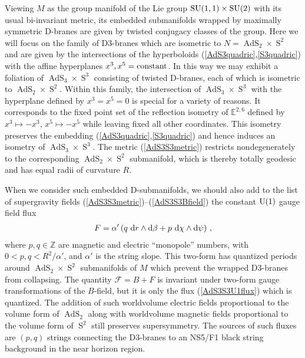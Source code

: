 \documentclass[11pt,a4paper]{article}
\DeclareMathOperator{\AdS}{AdS}
\DeclareMathOperator{\Sphere}{S}
\let\S\Sphere
\def\dd{{\rm d}}
\newcommand{\zed}{{\mathbb Z}} %
\newcommand{\eucl}{{\mathbb E}}
\newcommand{\beq}{\begin{eqnarray}}
\newcommand{\eeq}{\end{eqnarray}}
\begin{document}
Viewing $M$ as the group manifold of the Lie group ${\rm
  SU}(1,1)\times{\rm SU}(2)$ with its usual bi-invariant metric, its
  embedded submanifolds wrapped by maximally symmetric D-branes are given
  by twisted conjugacy classes of the group. Here we will focus on the
  family of D3-branes which are isometric to $N=\AdS_2\times\Sphere^2$
  and are given by the intersections of the hyperboloids
  (\ref{AdS3quadric},\ref{S3quadric}) with the affine hyperplanes
  $x^3,x^5={\rm constant}$. In this way we may
  exhibit a foliation of $\AdS_3\times\S^3$ consisting of twisted
  D-branes, each of which is isometric to
  $\AdS_2\times\S^2$. Within this family, the intersection of
  $\AdS_3\times\S^3$ with the hyperplane defined by $x^3=x^5=0$ is
  special for a variety of reasons. It
  corresponds to the fixed point set of the reflection isometry of
  $\eucl^{2,6}$ defined by $x^3\mapsto-x^3$, $x^5\mapsto-x^5$ while
  leaving fixed all other coordinates. This isometry preserves the
  embedding (\ref{AdS3quadric},\ref{S3quadric}) and hence induces an
  isometry of $\AdS_3\times\S^3$. The metric (\ref{AdS3S3metric})
  restricts nondegenerately to the corresponding $\AdS_2\times\S^2$
  submanifold, which is thereby totally geodesic and has equal radii of
  curvature $R$.

When we consider such embedded D-submanifolds, we should also add to
the list of supergravity fields
(\ref{AdS3S3metric})--(\ref{AdS3S3Bfield}) the
constant ${\rm U}(1)$ gauge field flux
\beq
F=\alpha'\,(q~\dd r\wedge\dd\beta+p~\dd\chi\wedge\dd\psi) \ ,
\label{AdS3S3U1flux}\eeq
where $p,q\in\zed$ are magnetic and electric ``monopole'' numbers, with
$0<p,q<R^2/\alpha'$, and $\alpha'$ is the string slope. This two-form
has quantized periods around $\AdS_2\times\Sphere^2$ submanifolds of
$M$ which prevent the wrapped D3-branes from collapsing. The quantity
${\mathcal F}=B+F$ is invariant under two-form gauge transformations
of the $B$-field, but it is only the flux (\ref{AdS3S3U1flux}) which
is quantized. The addition of such worldvolume electric fields
proportional to the volume form of $\AdS_2$ along with worldvolume
magnetic fields proportional to the volume form of $\S^2$ still
preserves supersymmetry. The sources of such fluxes are $(p,q)$
strings connecting the D3-branes to an NS5/F1 black string background
in the near horizon region.
\end{document}
